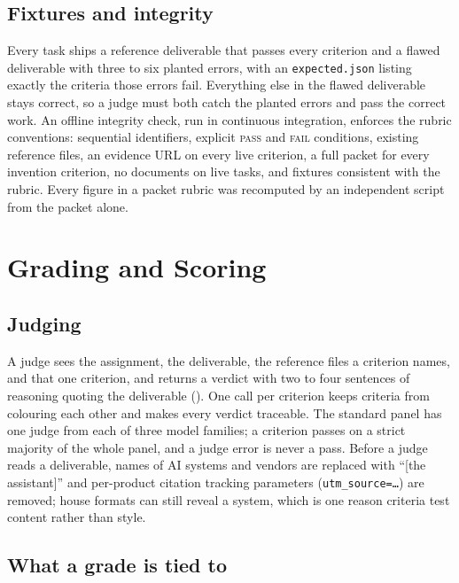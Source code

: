 \documentclass[11pt,a4paper]{article}
\newcommand{\pass}{\textsc{pass}}
\newcommand{\fail}{\textsc{fail}}
\begin{document}
\subsection{Fixtures and integrity}

Every task ships a reference deliverable that passes every criterion and a flawed deliverable with three to six planted errors, with an \texttt{expected.json} listing exactly the criteria those errors fail. Everything else in the flawed deliverable stays correct, so a judge must both catch the planted errors and pass the correct work. An offline integrity check, run in continuous integration, enforces the rubric conventions: sequential identifiers, explicit \pass{} and \fail{} conditions, existing reference files, an evidence URL on every live criterion, a full packet for every invention criterion, no documents on live tasks, and fixtures consistent with the rubric. Every figure in a packet rubric was recomputed by an independent script from the packet alone.

\section{Grading and Scoring}
\label{sec:grading}

\subsection{Judging}

A judge sees the assignment, the deliverable, the reference files a criterion names, and that one criterion, and returns a verdict with two to four sentences of reasoning quoting the deliverable (). One call per criterion keeps criteria from colouring each other and makes every verdict traceable. The standard panel has one judge from each of three model families; a criterion passes on a strict majority of the whole panel, and a judge error is never a pass. Before a judge reads a deliverable, names of AI systems and vendors are replaced with ``[the assistant]'' and per-product citation tracking parameters (\texttt{utm\_source=\ldots}) are removed; house formats can still reveal a system, which is one reason criteria test content rather than style.

\subsection{What a grade is tied to}
\end{document}
